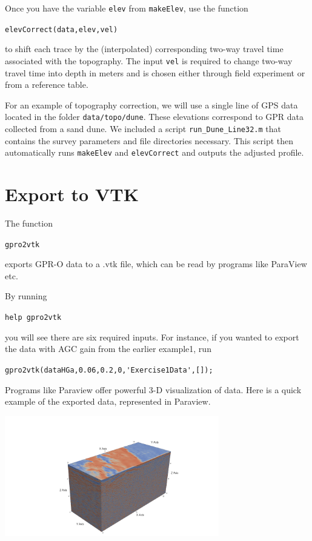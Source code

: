 \documentclass[11pt]{article}
\begin{document}
Once you have the variable \verb#elev# from \verb#makeElev#, use the function

\qquad \verb#elevCorrect(data,elev,vel)#

to shift each trace by the (interpolated) corresponding two-way travel
time associated with the topography. The input \verb#vel# is required to change two-way travel time 
into depth in meters and is chosen either through field experiment or from a reference table.

For an example of topography correction, we will use a single line of GPS data 
located in the folder \verb#data/topo/dune#. These elevations correspond to GPR data
collected from a sand dune. We included a script \verb#run_Dune_Line32.m# that
contains the survey parameters and file directories necessary. This script then 
automatically runs \verb#makeElev# and \verb#elevCorrect# and outputs the adjusted
profile.






\section{Export to VTK}

The function

\qquad \verb#gpro2vtk#

exports GPR-O data to a .vtk file, which can be
read by programs like ParaView etc.

By running

\qquad \verb#help gpro2vtk#

you will see there are six required inputs. For instance, if you
wanted to export the data with AGC gain from the earlier example1, run

\qquad \verb#gpro2vtk(dataHGa,0.06,0.2,0,'Exercise1Data',[]);#

Programs like Paraview offer powerful 3-D visualization of data.
Here is a quick example of the exported data, represented in Paraview.

\begin{center}
\includegraphics[width=0.7\textwidth, trim = 1cm 3cm 1cm
  3cm,clip]{figures/ParaviewEx.png}
\end{center}
\end{document}
